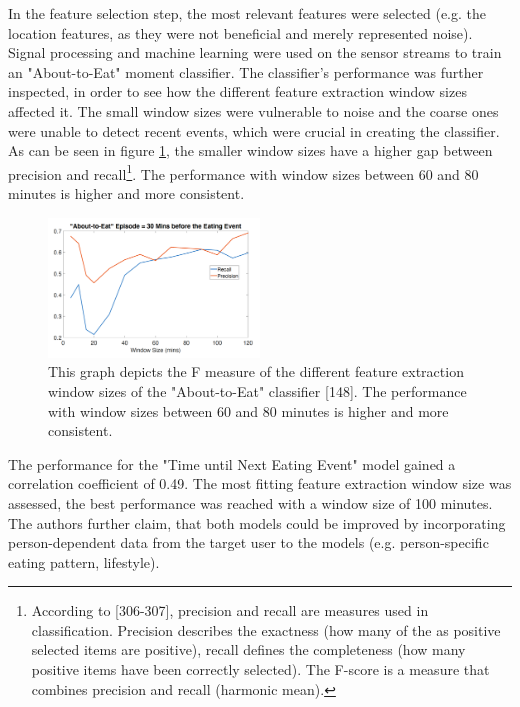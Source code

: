 In the feature selection step, the most relevant features were selected (e.g. the location features, as they were not beneficial and merely represented noise). Signal processing and machine learning were used on the sensor streams to train an "About-to-Eat" moment classifier. The classifier's performance was further inspected, in order to see how the different feature extraction window sizes affected it. The small window sizes were vulnerable to noise and the coarse ones were unable to detect recent events, which were crucial in creating the classifier. As can be seen in figure \ref{figure:windowSize}, the smaller window sizes have a higher gap between precision and recall\footnote{According to \textcite{han2011data}[306-307], precision and recall are measures used in classification. Precision describes the exactness (how many of the as positive selected items are positive), recall defines the completeness (how many positive items have been correctly selected). The F-score is a measure that combines precision and recall (harmonic mean).}. The performance with window sizes between 60 and 80 minutes is higher and more consistent.



\begin{figure}[h]
  \centering
  \includegraphics[width=0.5\textwidth]{./images/windowSizePerformance.png}
  \caption{This graph depicts the F measure of the different feature extraction window sizes of the "About-to-Eat" classifier \autocite{AboutToEat2016Rahman}[148]. The performance with window sizes between 60 and 80 minutes is higher and more consistent. }
  \label{figure:windowSize}
\end{figure}

The performance for the "Time until Next Eating Event" model gained a correlation coefficient of 0.49. The most fitting feature extraction window size was assessed, the best performance was reached with a window size of 100 minutes. The authors further claim, that both models could be improved by incorporating person-dependent data from the target user to the models (e.g. person-specific eating pattern, lifestyle).


